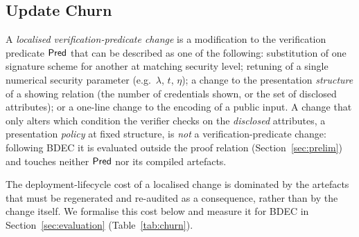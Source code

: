 \subsection{Update Churn}\label{ssec:update-churn}
\begin{definition}\label{def:lpc}
A \emph{localised verification-predicate change} is a modification to the verification predicate $\mathsf{Pred}$ that can be described as one of the following: substitution of one signature scheme for another at matching security level; retuning of a single numerical security parameter (e.g.\ $\lambda$, $t$, $\eta$); a change to the presentation \emph{structure} of a showing relation (the number of credentials shown, or the set of disclosed attributes); or a one-line change to the encoding of a public input. A change that only alters which condition the verifier checks on the \emph{disclosed} attributes, a presentation \emph{policy} at fixed structure, is \emph{not} a verification-predicate change: following BDEC it is evaluated outside the proof relation (Section~\ref{sec:prelim}) and touches neither $\mathsf{Pred}$ nor its compiled artefacts.
\end{definition}

The deployment-lifecycle cost of a localised change is dominated by the artefacts that must be regenerated and re-audited as a consequence, rather than by the change itself. We formalise this cost below and measure it for BDEC in Section~\ref{sec:evaluation} (Table~\ref{tab:churn}).

